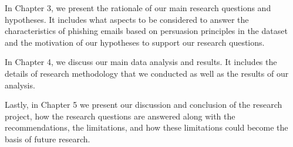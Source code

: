 In Chapter 3, we present the rationale of our main research questions
and hypotheses. It includes what aspects to be considered to answer
the characteristics of phishing emails based on persuasion principles
in the dataset and the motivation of our hypotheses to support our
research questions.

In Chapter 4, we discuss our main data analysis and results. It includes
the details of research methodology that we conducted as well as the
results of our analysis.

Lastly, in Chapter 5 we present our discussion and conclusion of the
research project, how the research questions are answered along with
the recommendations, the limitations, and how these limitations could
become the basis of future research.%

